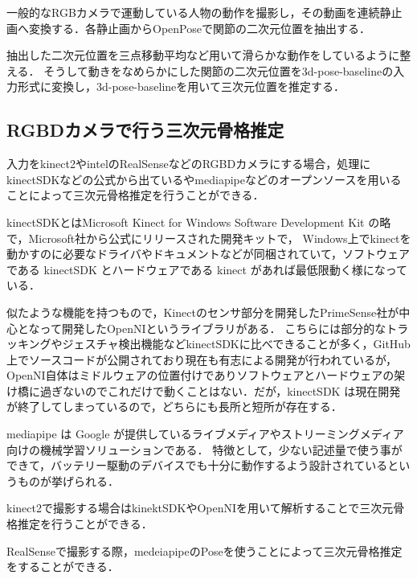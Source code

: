 \documentclass[titlepage]{jarticle}
\begin{document}
一般的なRGBカメラで運動している人物の動作を撮影し，その動画を連続静止画へ変換する．各静止画からOpenPoseで関節の二次元位置を抽出する．

抽出した二次元位置を三点移動平均など用いて滑らかな動作をしているように整える．
そうして動きをなめらかにした関節の二次元位置を3d-pose-baselineの入力形式に変換し，3d-pose-baselineを用いて三次元位置を推定する．

\subsection{RGBDカメラで行う三次元骨格推定}
入力をkinect2やintelのRealSenseなどのRGBDカメラにする場合，処理にkinectSDK\cite{kinectSDK}などの公式から出ているやmediapipe\cite{cubemos}などのオープンソースを用いることによって三次元骨格推定を行うことができる．

kinectSDKとはMicrosoft Kinect for Windows Software Development Kit の略で，Microsoft社から公式にリリースされた開発キットで，
Windows上でkinectを動かすのに必要なドライバやドキュメントなどが同梱されていて，ソフトウェアである kinectSDK とハードウェアである kinect があれば最低限動く様になっている．

似たような機能を持つもので，Kinectのセンサ部分を開発したPrimeSense社が中心となって開発したOpenNIというライブラリがある．
こちらには部分的なトラッキングやジェスチャ検出機能などkinectSDKに比べできることが多く，GitHub上でソースコードが公開されており現在も有志による開発が行われているが，
OpenNI自体はミドルウェアの位置付けでありソフトウェアとハードウェアの架け橋に過ぎないのでこれだけで動くことはない．だが，kinectSDK は現在開発が終了してしまっているので，どちらにも長所と短所が存在する．

mediapipe は Google が提供しているライブメディアやストリーミングメディア向けの機械学習ソリューションである．
特徴として，少ない記述量で使う事ができて，バッテリー駆動のデバイスでも十分に動作するよう設計されているというものが挙げられる．

kinect2で撮影する場合はkinektSDKやOpenNIを用いて解析することで三次元骨格推定を行うことができる．

RealSenseで撮影する際，medeiapipe\cite{cubemos}のPoseを使うことによって三次元骨格推定をすることができる．


\end{document}
